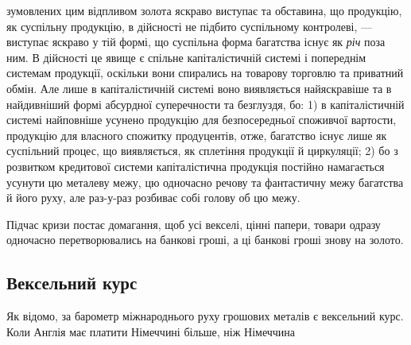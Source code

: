 зумовлених цим відпливом золота яскраво виступає та обставина, що продукцію,
як суспільну продукцію, в дійсності не підбито суспільному контролеві, —
виступає яскраво у тій формі, що суспільна форма багатства існує як \emph{річ} поза
ним. В дійсності це явище є спільне капіталістичній системі і попереднім системам
продукції, оскільки вони спирались на товарову торговлю та приватний
обмін. Але лише в капіталістичній системі воно виявляється найяскравіше та
в найдивніший формі абсурдної суперечности та безглуздя, бо: 1) в капіталістичній
системі найповніше усунено продукцію для безпосередньої споживчої
вартости, продукцію для власного спожитку продуцентів, отже, багатство існує
лише як суспільний процес, що виявляється, як сплетіння продукції й циркуляції;
2) бо з розвитком кредитової системи капіталістична продукція постійно
намагається усунути цю металеву межу, цю одночасно речову та фантастичну
межу багатства й його руху, але раз-у-раз розбиває собі голову об цю межу.

Підчас кризи постає домагання, щоб усі векселі, цінні папери, товари
одразу одночасно перетворювались на банкові гроші, а ці банкові гроші знову
на золото.

\subsection{Вексельний курс}

Як відомо, за барометр міжнароднього руху грошових металів є вексельний
курс. Коли Англія має платити Німеччині більше, ніж Німеччина
\parbreak{}  %
